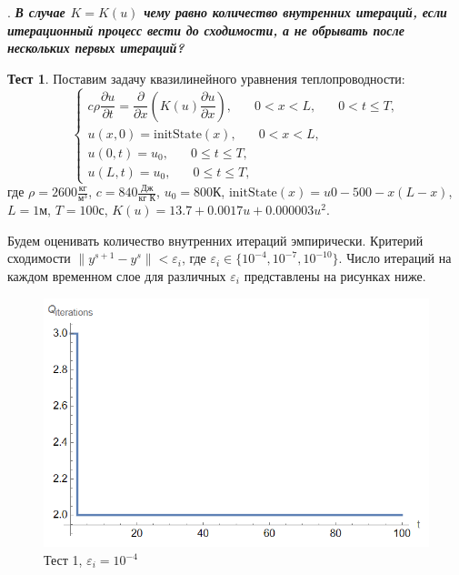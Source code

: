 \documentclass[12pt, a4paper]{article}
\newcounter{mycounter}
\newcommand{\quastion}[1]{%
	\stepcounter{mycounter}%
	\textbf{\themycounter}.  %
	\textbf{\textit{#1}}
	
}
\begin{document}
	
	\clearpage %
	\quastion{В случае $K = K(u)$ чему равно количество внутренних итераций, если итерационный процесс вести до сходимости, а не обрывать после нескольких первых итераций?}
	
	\textbf{Тест 1}. Поставим задачу квазилинейного уравнения теплопроводности:
	\[
	\begin{cases}
		c \rho \dfrac{\partial u}{\partial t} = \dfrac{\partial}{\partial x}\left(K(u)\dfrac{\partial u}{\partial x} \right), \phantom{xxx} 0<x<L, \phantom{xxx} 0<t\le T, \\
		u(x,0) = \text{initState}(x), \phantom{xxx} 0<x<L,\\
		u(0,t) = u_0, \phantom{xxx} 0 \le t \le T,\\
		u(L, t) = u_0, \phantom{xxx} 0 \le t \le T,
	\end{cases}
	\]
	где $\rho = 2600\frac{\text{кг}}{\text{м}^3}$, $c = 840 \frac{\text{Дж}}{\text{кг К}}$, $u_0 = 800$К, $\text{initState}(x)=u0-500 - x(L-x)$, $L=1$м, $T=100$с, $K(u)=13.7+0.0017u+0.000003u^2$.
	
	Будем оценивать количество внутренних итераций эмпирически. Критерий сходимости $\|y^{s+1}-y^{s}\| < \varepsilon_i$, где $\varepsilon_i \in \{10^{-4},10^{-7},10^{-10}\}$. Число итераций на каждом временном слое для различных $\varepsilon_i$ представлены на рисунках ниже.
	
	 \begin{figure}[H]
		\centering
		\includegraphics[width=1\textwidth]{test1-1e-4}
		\caption{Тест 1, $\varepsilon_i=10^{-4}$}
	\end{figure}
\end{document}
